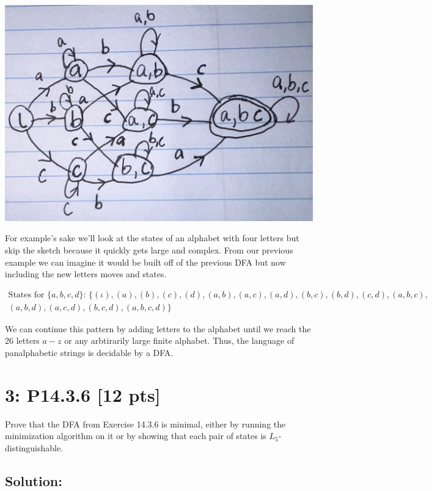 \documentclass[12pt]{article}
\begin{document}
\begin{center}
\includegraphics[scale=.2]{14.2.4.2}
\end{center}

For example's sake we'll look at the states of an alphabet with four letters but skip the sketch because it quickly gets large and complex. From our previous example we can imagine it would be built off of the previous DFA but now including the new letters moves and states.

\begin{multline*}
 \text{States for } \{ a, b, c, d \} \text{: } \{ (\iota), (a), (b), (c), (d), (a,b), (a,c), (a,d), (b,c), (b,d), (c,d), (a,b,c), \\
(a,b,d), (a,c,d), (b,c,d), (a,b,c,d) \}
\end{multline*}

We can continue this pattern by adding letters to the alphabet until we reach the 26 letters $a-z$ or any arbtirarily large finite alphabet. Thus, the language of panalphabetic strings is decidable by a DFA.

\newpage
\section*{\textbf{3: P14.3.6} [12 pts]}
Prove that the DFA from Exercise 14.3.6 is minimal, either by running the minimization algorithm on it or by showing that each pair of states is $L_5$-distinguishable.


\subsection*{\textbf{Solution:}}
\end{document}
